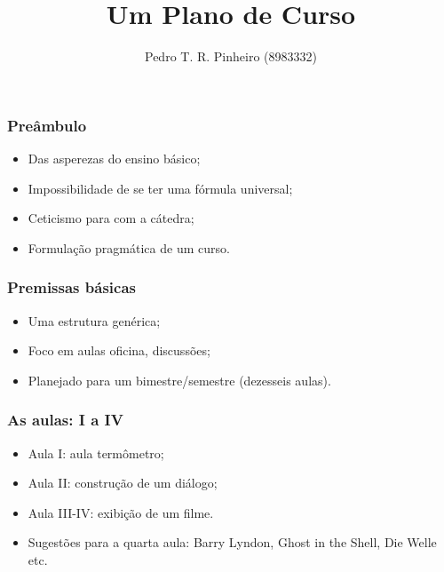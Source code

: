 \documentclass[12pt]{beamer}
\begin{document}
	\author{Pedro T. R. Pinheiro (8983332)}
	\title{Um Plano de Curso}
	\begin{frame}[plain]
	\maketitle
\end{frame}

\begin{frame}
\frametitle{Preâmbulo}

	\begin{itemize}
		\item Das asperezas do ensino básico; 
		\item Impossibilidade de se ter uma fórmula universal; 
		\item Ceticismo para com a cátedra; 
		\item Formulação pragmática de um curso. 
	\end{itemize}

\end{frame}

\begin{frame}
\frametitle{Premissas básicas}

	\begin{itemize}
		\item Uma estrutura genérica; 
		\item Foco em aulas oficina, discussões; 
		\item Planejado para um bimestre/semestre (dezesseis aulas). 
	\end{itemize}

\end{frame}

\begin{frame}
\frametitle{As aulas: I a IV}

	\begin{itemize}
		\item Aula I: aula termômetro; 
		\item Aula II: construção de um diálogo; 
		\item Aula III-IV: exibição de um filme. 
		\item Sugestões para a quarta aula: Barry Lyndon, Ghost in the Shell, 
		Die Welle etc. 
	\end{itemize}

\end{frame}
\end{document}
